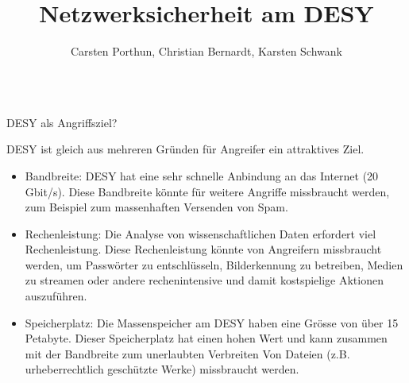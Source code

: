 \documentclass[final]{beamer}
\title{Netzwerksicherheit am DESY} %
\author{Carsten Porthun, Christian Bernardt, Karsten Schwank} %
\newlength{\sepwid}
\begin{document}

\setlength{\belowcaptionskip}{2ex} %
\setlength\belowdisplayshortskip{2ex} %

\begin{frame}[t] %

\begin{columns}[t]
 \begin{column}{0.95\textwidth}
  \begin{alertblock}{DESY als Angriffsziel?}
   \small{
   DESY ist gleich aus mehreren Gründen für Angreifer ein attraktives Ziel. 
   \begin{itemize}
    \item Bandbreite: DESY hat eine sehr schnelle Anbindung an das Internet 
    (20 Gbit/s). Diese Bandbreite könnte für weitere Angriffe missbraucht 
    werden, zum Beispiel zum massenhaften Versenden von Spam.

    \item Rechenleistung: Die Analyse von wissenschaftlichen Daten erfordert 
    viel Rechenleistung. Diese Rechenleistung könnte von Angreifern missbraucht werden,
    um Passwörter zu entschlüsseln, Bilderkennung zu betreiben, Medien zu streamen oder 
    andere rechenintensive und damit kostspielige Aktionen auszuführen.

    \item  Speicherplatz: Die Massenspeicher am DESY haben eine Grösse von über 
    15 Petabyte. Dieser Speicherplatz hat einen hohen Wert und kann zusammen 
    mit der Bandbreite zum unerlaubten Verbreiten Von Dateien (z.B. urheberrechtlich 
    geschützte Werke) missbraucht werden.
   \end{itemize}
   }
  \end{alertblock}
 \end{column}
\end{columns}


\begin{columns}[t, totalwidth=\textwidth] %

\begin{column}{\sepwid}\end{column} %


\end{columns}
\end{frame}
\end{document}
